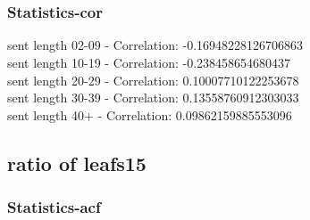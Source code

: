 \documentclass{article}%
\begin{document}
\begin{figure}[ht]%
\centering%
\setlength{\abovecaptionskip}{-35pt}%
%
%
\\%
%
%
\\%
%
\end{figure}

%
\newpage%
\subsubsection{Statistics{-}cor}%
\label{ssubsec:Statistics{-}cor}%
\noindent%
sent length 02-09 - Correlation: -0.16948228126706863\\%
sent length 10-19 - Correlation: -0.238458654680437\\%
sent length 20-29 - Correlation: 0.10007710122253678\\%
sent length 30-39 - Correlation: 0.13558760912303033\\%
sent length 40+ - Correlation: 0.09862159885553096\\

%
\newpage

%
\subsection{ratio of leafs15}%
\label{subsec:ratioofleafs15}%
\subsubsection{Statistics{-}acf}%
\label{ssubsec:Statistics{-}acf}%
\end{document}
